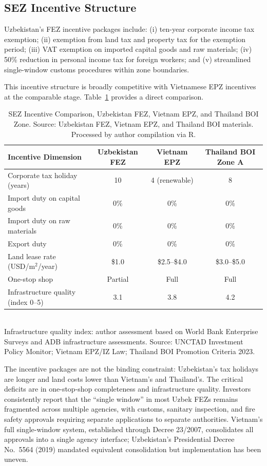 \subsection{SEZ Incentive Structure}

Uzbekistan's FEZ incentive packages include: (i) ten-year corporate income tax exemption; (ii) exemption from land tax and property tax for the exemption period; (iii) VAT exemption on imported capital goods and raw materials; (iv) 50\% reduction in personal income tax for foreign workers; and (v) streamlined single-window customs procedures within zone boundaries.

This incentive structure is broadly competitive with Vietnamese EPZ incentives at the comparable stage. Table~\ref{tab:sez_incentives} provides a direct comparison.

\begin{table}[H]
 \centering
 \caption{SEZ Incentive Comparison, Uzbekistan FEZ, Vietnam EPZ, and Thailand BOI Zone. Source: Uzbekistan FEZ, Vietnam EPZ, and Thailand BOI materials. Processed by author compilation via R.}
 \label{tab:sez_incentives}
 \small
 \begin{tabular}{@{}lccc@{}}
 \toprule
 Incentive Dimension & Uzbekistan FEZ & Vietnam EPZ & Thailand BOI Zone A \\
 \midrule
 Corporate tax holiday (years) & 10 & 4 (renewable) & 8 \\
 Import duty on capital goods & 0\% & 0\% & 0\% \\
 Import duty on raw materials & 0\% & 0\% & 0\% \\
 Export duty & 0\% & 0\% & 0\% \\
 Land lease rate (USD/m$^2$/year) & \$1.0 & \$2.5--\$4.0 & \$3.0--\$5.0 \\
 One-stop shop & Partial & Full & Full \\
 Infrastructure quality (index 0--5) & 3.1 & 3.8 & 4.2 \\
 \bottomrule
 \end{tabular}
 \\\smallskip
 \small Infrastructure quality index: author assessment based on World Bank Enterprise Surveys and ADB infrastructure assessments. Source: UNCTAD Investment Policy Monitor; Vietnam EPZ/IZ Law; Thailand BOI Promotion Criteria 2023.
\end{table}

The incentive packages are not the binding constraint: Uzbekistan's tax holidays are longer and land costs lower than Vietnam's and Thailand's. The critical deficits are in one-stop-shop completeness and infrastructure quality. Investors consistently report that the ``single window'' in most Uzbek FEZs remains fragmented across multiple agencies, with customs, sanitary inspection, and fire safety approvals requiring separate applications to separate authorities. Vietnam's full single-window system, established through Decree 23/2007, consolidates all approvals into a single agency interface; Uzbekistan's Presidential Decree No.~5564 (2019) mandated equivalent consolidation but implementation has been uneven.

